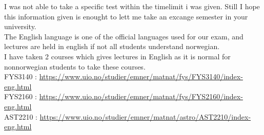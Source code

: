 \documentclass[11pt, A4paper, norsk]{article}
\begin{document}
I was not able to take a specific test within the timelimit i was given. Still I hope this information given is enought to lett me take an excange semester in your university. \\
The English language is one of the official languages used for our exam, and lectures are held in english if not all students understand norwegian. \\
I have taken 2 courses which gives lectures in English as it is normal for nonnorwegian students to take these courses. \\
FYS3140 : \url{https://www.uio.no/studier/emner/matnat/fys/FYS3140/index-eng.html} \\
FYS2160 : \url{https://www.uio.no/studier/emner/matnat/fys/FYS2160/index-eng.html} \\
AST2210 : \url{https://www.uio.no/studier/emner/matnat/astro/AST2210/index-eng.html}
\end{document}
